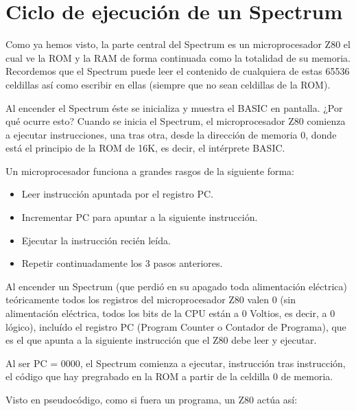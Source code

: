 \documentclass[letterpaper,10pt,spanish]{sphinxmanual}
\begin{document}
\section{Ciclo de ejecución de un Spectrum}
\label{\detokenize{03_arquitectura/arquitectura:ciclo-de-ejecucion-de-un-spectrum}}
Como ya hemos visto, la parte central del Spectrum es un microprocesador Z80 el cual ve la ROM y la RAM de forma continuada como la totalidad de su memoria. Recordemos que el Spectrum puede leer el contenido de cualquiera de estas 65536 celdillas así como escribir en ellas (siempre que no sean celdillas de la ROM).

Al encender el Spectrum éste se inicializa y muestra el BASIC en pantalla. ¿Por qué ocurre esto? Cuando se inicia el Spectrum, el microprocesador Z80 comienza a ejecutar instrucciones, una tras otra, desde la dirección de memoria 0, donde está el principio de la ROM de 16K, es decir, el intérprete BASIC.

Un microprocesador funciona a grandes rasgos de la siguiente forma:
\begin{itemize}
\item {} 
Leer instrucción apuntada por el registro PC.

\item {} 
Incrementar PC para apuntar a la siguiente instrucción.

\item {} 
Ejecutar la instrucción recién leída.

\item {} 
Repetir continuadamente los 3 pasos anteriores.

\end{itemize}

Al encender un Spectrum (que perdió en su apagado toda alimentación eléctrica) teóricamente todos los registros del microprocesador Z80 valen 0 (sin alimentación eléctrica, todos los bits de la CPU están a 0 Voltios, es decir, a 0 lógico), incluído el registro PC (Program Counter o Contador de Programa), que es el que apunta a la siguiente instrucción que el Z80 debe leer y ejecutar.

Al ser PC = 0000, el Spectrum comienza a ejecutar, instrucción tras instrucción, el código que hay pregrabado en la ROM a partir de la celdilla 0 de memoria.

Visto en pseudocódigo, como si fuera un programa, un Z80 actúa así:
\end{document}
